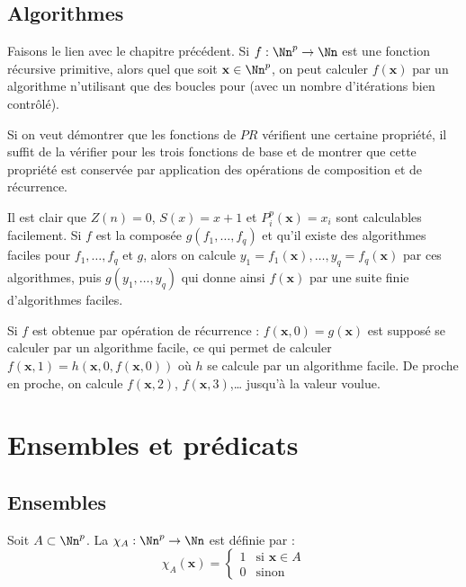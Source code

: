 \documentclass[11pt,class=report,crop=false]{standalone}
\begin{document}
\subsection{Algorithmes} 

Faisons le lien avec le chapitre précédent. Si $f : \Nn^p \to \Nn$ est une fonction récursive primitive, alors quel que soit $\mathbf{x} \in \Nn^p$, on peut calculer $f(\mathbf{x})$ par un algorithme n'utilisant que des boucles \og{}pour\fg{} (avec un nombre d'itérations bien contrôlé).

Si on veut démontrer que les fonctions de $PR$ vérifient une certaine propriété, il suffit de la vérifier pour les trois fonctions de base et de montrer que cette propriété est conservée par application des opérations de composition et de récurrence. 


Il est clair que $Z(n)=0$, $S(x)=x+1$ et $P_i^p(\mathbf{x}) = x_i$ sont calculables facilement.
Si $f$ est la composée $g(f_1, \dots, f_q)$ et qu'il existe des algorithmes faciles pour $f_1, \dots, f_q$ et $g$, alors on calcule $y_1 = f_1(\mathbf{x}), \dots, y_q = f_q(\mathbf{x})$ par ces algorithmes, puis $g(y_1, \dots, y_q)$ qui donne ainsi $f(\mathbf{x})$ par une suite finie d'algorithmes faciles.

Si $f$ est obtenue par opération de récurrence : $f(\mathbf{x},0)=g(\mathbf{x})$ est supposé se calculer par un algorithme facile, ce qui permet de calculer $f(\mathbf{x},1) = h(\mathbf{x},0,f(\mathbf{x},0))$ où $h$ se calcule par un algorithme facile. De proche en proche, on calcule $f(\mathbf{x},2)$, $f(\mathbf{x},3)$,\ldots{} jusqu'à la valeur voulue.



\section{Ensembles et prédicats}

\subsection{Ensembles}

\begin{definition}
Soit $A \subset \Nn^p$. La  $\chi_A : \Nn^p \to \Nn$ est définie par :
\[ \chi_A(\mathbf{x}) = \begin{cases} 1 & \text{si } \mathbf{x} \in A \\ 0 & \text{sinon} \end{cases} \]
\end{definition}
\end{document}
